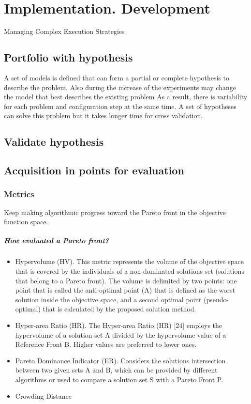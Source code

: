 \chapter{Implementation. Development}
Managing Complex Execution Strategies

\section{Portfolio with hypothesis}
A set of models is defined that can form a partial or complete hypothesis to describe the problem.
Also during the increase of the experiments may change the model that best describes the existing problem
As a result, there is variability for each problem and configuration step at the same time. 
A set of hypotheses can solve this problem but it takes longer time for cross validation.

\section{Validate hypothesis}
\section{Acquisition in points for evaluation}

    \subsection{Metrics}
    Keep making algorithmic progress toward the Pareto front in the objective function space.
    \paragraph{How evaluated a Pareto front?}
    \begin{itemize}
        \item Hypervolume (HV). 
        This metric represents the volume of the objective space
        that is covered by the individuals of a non-dominated
        solutions set (solutions that belong to a Pareto front). The
        volume is delimited by two points: one point that is called
        the anti-optimal point (A) that is defined as the worst
        solution inside the objective space, and a second optimal
        point (pseudo-optimal) that is calculated by the proposed
        solution method. 
        \item Hyper-area Ratio (HR).
        The Hyper-area Ratio (HR) [24] employs the hypervolume of a solution set A
        divided by the hypervolume value of a Reference Front B. Higher values are
        preferred to lower ones.
        \item Pareto Dominance Indicator (ER). 
        Considers the solutions intersection between two given sets A and B, which can be 
        provided by different algorithms or used to compare a solution set S with a Pareto Front P.
        \item Crowding Distance
        
    \end{itemize}

